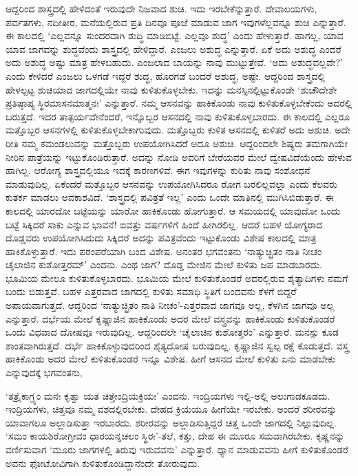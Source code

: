 ಆದ್ದರಿಂದ ಶಾಸ್ತ್ರದಲ್ಲಿ ಹೇಳಿದಂತೆ ಇರುವುದೇ ನಿಜವಾದ ಶುಚಿ. ಇದು ಇರಬೇಕೆನ್ನುತ್ತಾರೆ. ದೇವಾಲಯಗಳು, ಪರ್ವತಗಳು, ನದೀತೀರ, ಮನೆಯಲ್ಲಿರುವ ಪ್ರತಿ ದಿನವೂ ಪೂಜೆ ಮಾಡುವ ಜಾಗ ಇವುಗಳೆಲ್ಲವನ್ನೂ ಶುಚಿ ಎನ್ನುತ್ತಾರೆ. ಈ ಕಾಲದಲ್ಲಿ `ಎಲ್ಲವನ್ನೂ ಸುಂದರವಾಗಿ ಶುದ್ಧಿ ಮಾಡಿಬಿಟ್ಟೆ. ಎಲ್ಲವೂ ಶುದ್ಧ' ಎಂದು ಹೇಳುತ್ತಾರೆ. ಹಾಗಲ್ಲ, ಯಾವ ಯಾವ ಜಾಗವನ್ನು ಶುದ್ಧವೆಂದು ಶಾಸ್ತ್ರದಲ್ಲಿ ಹೇಳಿದ್ದಾರೆ. ಎಂಜಲು ಅಶುದ್ಧ ಎನ್ನುತ್ತಾರೆ. ಏಕೆ ಅದು ಅಶುದ್ಧ ಎಂದರೆ ಅದು ಅಶುದ್ಧ ಅಷ್ಟು ಮಾತ್ರ ಹೇಳಬಹುದು. ಎಂಜಲಾದ ಬಾಯನ್ನು ನಾವು ಮುಟ್ಟುತ್ತೇವೆ. `ಅದು ಅಶುದ್ಧವಲ್ಲವೇ?' ಎಂದು ಕೇಳಿದರೆ ಎಂಜಲು ಒಳಗಡೆ ಇದ್ದರೆ ಶುದ್ಧ, ಹೊರಗಡೆ ಬಂದರೆ ಅಶುದ್ಧ, ಅಷ್ಟೇ. ಆದ್ದರಿಂದ ಶಾಸ್ತ್ರದಲ್ಲಿ ಹೇಳಲ್ಪಟ್ಟ ಶುಚಿಯಾದ ಜಾಗದಲ್ಲಿಯೇ ನಾವು ಕುಳಿತುಕೊಳ್ಳಬೇಕು. ಇದನ್ನು ಮನಸ್ಸಿನಲ್ಲಿಟ್ಟುಕೊಂಡೇ `ಶುಚೌದೇಶೇ ಪ್ರತಿಷ್ಠಾಪ್ಯ ಸ್ಥಿರಮಾಸನಮಾತ್ಮನಃ' ಎನ್ನುತ್ತಾರೆ. ನಮ್ಮ ಆಸನವನ್ನು ಹಾಕಿಕೊಂಡು ನಾವು ಕುಳಿತುಕೊಳ್ಳಬೇಕೆಂದು ಅದರಲ್ಲಿ ಬರುತ್ತದೆ. ಇದರ ತಾತ್ಪರ್ಯವೇನೆಂದರೆ, ಇನ್ನೊಬ್ಬರ ಆಸನದಲ್ಲಿ ನಾವು ಕುಳಿತುಕೊಳ್ಳಬಾರದು. ಈ ಕಾಲದಲ್ಲಿ ಎಲ್ಲರೂ ಮತ್ತೊಬ್ಬರ ಆಸನಗಳಲ್ಲಿ ಕುಳಿತುಕೊಳ್ಳಬೇಕಾಗುವುದು. ಮತ್ತೊಬ್ಬರು ಕುಳಿತ ಆಸನದಲ್ಲಿ ಕುಳಿತರೆ ಅದು ಅಶುಚಿ. ಅದೇ ರೀತಿ ನಮ್ಮ ಕಮಂಡಲುವನ್ನು ಮತ್ತೊಬ್ಬರು ಉಪಯೋಗಿಸಿದರೆ ಅದೂ ಅಶುಚಿ. ಆದ್ದರಿಂದಲೇ ಶಿಷ್ಯರು ತಮಗಾಗಿಯೇ ನೀರಿನ ಪಾತ್ರೆಯನ್ನು ಇಟ್ಟುಕೊಂಡಿರುತ್ತಾರೆ. ಅದನ್ನು ನೋಡಿ ಅವರಿಗೆ ಬೇರೆಯವರ ಮೇಲೆ ದ್ವೇಷವಿದೆಯೆಂದು ಹೇಳುವ ಹಾಗಿಲ್ಲ. ಆರೋಗ್ಯ ಶಾಸ್ತ್ರದಲ್ಲಿಯೂ ಇದಕ್ಕೆ ಕಾರಣಗಳಿವೆ. ಈಗ ಇವುಗಳನ್ನು ಕುರಿತು ನಾವು ಸಂಶೋಧನೆ ಮಾಡುವುದಿಲ್ಲ. ಏಕೆಂದರೆ ಮತ್ತೊಬ್ಬರ ಆಸನವನ್ನು ಉಪಯೋಗಿಸಿದರೂ ರೋಗ ಬರಲಿಲ್ಲವಲ್ಲಾ ಎಂದು ಕೆಲವರು ಕುತರ್ಕ ಮಾಡಲು ಅವಕಾಶವಿದೆ. `ಶಾಸ್ತ್ರದಲ್ಲಿ ಪವಿತ್ರತೆ ಇಲ್ಲ' ಎಂದು ಒಂದೇ ಮಾತಿನಲ್ಲಿ ಮುಗಿಸಿಬಿಡುತ್ತಾರೆ. ಈ ಕಾಲದಲ್ಲಿ ಯಾರದೋ ಬಟ್ಟೆಯನ್ನು ಯಾರೋ ಹಾಕಿಕೊಂಡು ಹೋಗುತ್ತಾರೆ. ಆ ಸಮಯದಲ್ಲಿ ಯಾವುದೋ ಒಂದು ಬಟ್ಟೆ ಸಿಕ್ಕಿದರೆ ಸಾಕು ಎನ್ನುವ ಭಾವನೆ! ಐವತ್ತು ವರ್ಷಗಳಿಗೆ ಹಿಂದೆ ಹೀಗಿರಲಿಲ್ಲ. ಆದರೆ ಬಹಳ ಯೋಗ್ಯರಾದ ದೊಡ್ಡವರು ಉಪಯೋಗಿಸಿದುದು ಸಿಕ್ಕಿದರೆ ಅದನ್ನು ಪವಿತ್ರವೆಂದು ಇಟ್ಟುಕೊಂಡು ವಿಶೇಷ ಕಾಲದಲ್ಲಿ ಮಾತ್ರ ಹಾಕಿಕೊಳ್ಳುತ್ತಾರೆ. ಇದು ಪರಂಪರೆಯಾಗಿ ಬಂದ ವಿಶೇಷ. ಅನಂತರ ಭಗವಂತನು `ನಾತ್ಯುಚ್ಛ್ರಿತಂ ನಾತಿ ನೀಚಂ ಚೈಲಾಜಿನ ಕುಶೋತ್ತರಮ್' ಎಂದನು. ಎಂಥ ಜಾಗ? ದೊಡ್ಡ ಮೇಜಿನ ಮೇಲೆ ಕುಳಿತು ಜಪ ಮಾಡಬಾರದು. ಭೂಮಿಯ ಮೇಲೂ ಕುಳಿತುಕೊಳ್ಳಬಾರದು. ಭೂಮಿಯ ಮೇಲೆ ಕುಳಿತುಕೊಂಡರೆ ಅದರಲ್ಲಿರುವ ಶೈತ್ಯಾದಿಗಳು ನಮಗೆ ಬಂದು ಬಿಡುತ್ತವೆ. ಬಹಳ ಎತ್ತರವಾದ ಜಾಗದಲ್ಲಿ ಕುಳಿತು ಸಮಾಧಿ ಸ್ಥಿತಿಗೆ ಬಂದವನು ಕೆಳಗೆ ಬಿದ್ದರೆ ಅಪಾಯವಾಗುತ್ತದೆ. ಆದ್ದರಿಂದ `ನಾತ್ಯುಚ್ಛ್ರಿತಂ ನಾತಿ ನೀಚಂ'-ಎತ್ತರವಾದ ಜಾಗವೂ ಅಲ್ಲ, ಕೆಳಗಿನ ಜಾಗವೂ ಅಲ್ಲ ಎನ್ನುತ್ತಾರೆ. ದರ್ಭೆಯ ಮೇಲೆ ಕೃಷ್ಣಾಜಿನ ಹಾಕಿಕೊಂಡು ಅದರ ಮೇಲೆ ವಸ್ತ್ರವನ್ನು ಹಾಕಿಕೊಂಡು ಕುಳಿತುಕೊಂಡರೆ ಒಂದು ವಿಧವಾದ ದೋಷವೂ ಇರುವುದಿಲ್ಲ. ಆದ್ದರಿಂದಲೇ `ಚೈಲಾಚಿನ ಕುಶೋತ್ತರಂ' ಎನ್ನುತ್ತಾರೆ. ಮನಸ್ಸು ಕೂಡ ಶಾಂತವಾಗಿರುತ್ತದೆ. ದರ್ಭೆ ಹಾಕಿಕೊಳ್ಳುವುದರಿಂದ ಶೈತ್ಯದೋಷ ಬರುವುದಿಲ್ಲ. ಕೃಷ್ಣಾಜಿನ ಸ್ವಲ್ಪ ರಕ್ಷೆ ಕೊಡುತ್ತದೆ. ವಸ್ತ್ರ ಹಾಕಿಕೊಂಡು ಅದರ ಮೇಲೆ ಕುಳಿತುಕೊಂಡರೆ ಇನ್ನೂ ವಿಶೇಷ. ಹೀಗೆ ಆಸನದ ಮೇಲೆ ಕುಳಿತು ಏನು ಮಾಡಬೇಕು ಎನ್ನುವುದಕ್ಕೆ ಭಗವಂತನು,

`ತತ್ರೈಕಾಗ್ರ್ಯಂ ಮನಃ ಕೃತ್ವಾ ಯತ ಚಿತ್ತೇಂದ್ರಿಯಕ್ರಿಯಃ' ಎಂದನು. ಇಂದ್ರಿಯಗಳು ಇಲ್ಲಿ-ಅಲ್ಲಿ ಅಲುಗಾಡಕೂಡದು. ಇಂದ್ರಿಯಗಳು, ಚಿತ್ತವೂ ನಮ್ಮ ವಶದಲ್ಲಿರಬೇಕು. ದೇಹದ ಕ್ರಿಯೆಯೂ ಹೀಗೆಯೇ ಇರಬೇಕು. ಅಂದರೆ ಶರೀರವನ್ನು ಯಾವಾಗಲೂ ಅಲ್ಲಾಡಿಸುತ್ತಾ ಇರಬಾರದು. ಶರೀರವನ್ನು ಅಲ್ಲಾಡಿಸುತ್ತಿದ್ದರೆ ಚಿತ್ತ ಒಂದೇ ಜಾಗದಲ್ಲಿ ನಿಲ್ಲುವುದಿಲ್ಲ. `ಸಮಂ ಕಾಯಶಿರೋಗ್ರೀವಂ ಧಾರಯನ್ನಚಲಂ ಸ್ಥಿರಃ'-ತಲೆ, ಕತ್ತು, ದೇಹ ಈ ಮೂರೂ ಸಮವಾಗಿರಬೇಕು. ಕೃಷ್ಣನನ್ನು ವರ್ಣಿಸುವಾಗ `ಮೂರು ಜಾಗಗಳಲ್ಲಿ ತಿರುವು ಇರುವವನು' ಎನ್ನುತ್ತಾರೆ. ಧ್ಯಾನ ಮಾಡುವವನು ಹೀಗೆ ಕುಳಿತುಕೊಂಡರೆ ಅವನು ಫೋಟೋವಿಗಾಗಿ ಕುಳಿತುಕೊಂಡಿದ್ದಾನೆಂದೇ ತೋರುವುದು.

